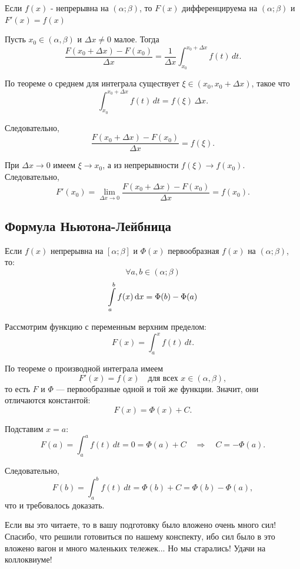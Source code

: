     \begin{theorem}
        Если $f(x)$ - непрерывна на $(\alpha; \beta)$, то $F(x)$ дифференцируема на $(\alpha; \beta)$ и $F'(x) = f(x)$\\
    \end{theorem}
\begin{Proof}
    Пусть $x_0\in (\alpha,\beta)$ и $\Delta x \neq 0$ малое. Тогда
\[
\frac{F(x_0+\Delta x)-F(x_0)}{\Delta x}
=
\frac{1}{\Delta x}\int_{x_0}^{x_0+\Delta x} f(t)\,dt.
\]

По теореме о среднем для интеграла существует $\xi \in (x_0, x_0+\Delta x)$, такое что
\[
\int_{x_0}^{x_0+\Delta x} f(t)\,dt = f(\xi)\,\Delta x.
\]

Следовательно,
\[
\frac{F(x_0+\Delta x)-F(x_0)}{\Delta x} = f(\xi).
\]

При $\Delta x \to 0$ имеем $\xi \to x_0$, а из непрерывности $f(\xi) \to f(x_0)$. Следовательно,
\[
F'(x_0) = \lim_{\Delta x \to 0} \frac{F(x_0+\Delta x)-F(x_0)}{\Delta x} = f(x_0).
\]
    \end{Proof}

\subsection{Формула Ньютона-Лейбница}
    \begin{theorem}
        Если $f(x)$ непрерывна на $[\alpha; \beta]$ и $\Phi(x)$ первообразная $f(x)$ на $(\alpha; \beta)$, то:
        \[
            \forall a, b \in (\alpha; \beta)
        \]
        \[
\int\limits_{a}^{b}f(x)\mathop{}\!\mathrm{d} x = \Phi(b) - \Phi(a)
        \]
    \end{theorem}

    \begin{Proof}
Рассмотрим функцию с переменным верхним пределом:
\[
F(x) = \int_a^x f(t)\,dt.
\]

По теореме о производной интеграла имеем
\[
F'(x) = f(x) \quad \text{для всех } x \in (\alpha,\beta),
\]
то есть $F$ и $\Phi$ — первообразные одной и той же функции. Значит, они отличаются константой:
\[
F(x) = \Phi(x) + C.
\]

Подставим $x=a$:
\[
F(a) = \int_a^a f(t)\,dt = 0 = \Phi(a) + C \quad \Rightarrow \quad C = -\Phi(a).
\]

Следовательно,
\[
F(b) = \int_a^b f(t)\,dt = \Phi(b) + C = \Phi(b) - \Phi(a),
\]
что и требовалось доказать.
    \end{Proof}

    Если вы это читаете, то в вашу подготовку было вложено очень много сил! Спасибо, что решили готовиться по нашему конспекту, ибо сил было в это вложено вагон и много маленьких тележек... Но мы старались!
    Удачи на коллоквиуме!
